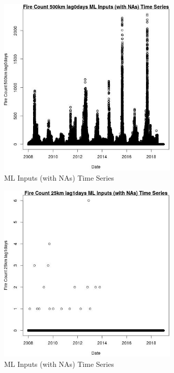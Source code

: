 \begin{figure} 
\centering  
\includegraphics[width=0.77\textwidth]{Code_Outputs/Report_ML_input_PM25_Step4_part_e_de_duplicated_aves_compiled_2019-05-21wNAs_Fire_Count_500km_lag0daysvDate.jpg} 
\caption{\label{fig:Report_ML_input_PM25_Step4_part_e_de_duplicated_aves_compiled_2019-05-21wNAsFire_Count_500km_lag0daysvDate}ML Inputs (with NAs) Time Series} 
\end{figure} 
 

\begin{figure} 
\centering  
\includegraphics[width=0.77\textwidth]{Code_Outputs/Report_ML_input_PM25_Step4_part_e_de_duplicated_aves_compiled_2019-05-21wNAs_Fire_Count_25km_lag1daysvDate.jpg} 
\caption{\label{fig:Report_ML_input_PM25_Step4_part_e_de_duplicated_aves_compiled_2019-05-21wNAsFire_Count_25km_lag1daysvDate}ML Inputs (with NAs) Time Series} 
\end{figure} 
 

